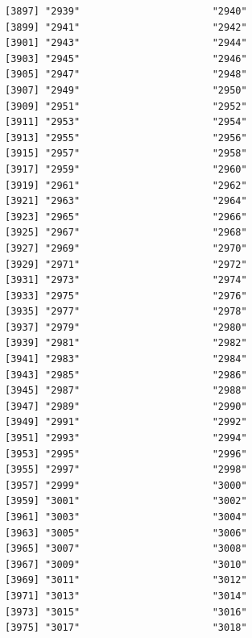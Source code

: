 \documentclass[
  letterpaper,
  DIV=11,
  numbers=noendperiod]{scrreprt}
\begin{document}
\begin{verbatim}
[3897] "2939"                       "2940"                      
[3899] "2941"                       "2942"                      
[3901] "2943"                       "2944"                      
[3903] "2945"                       "2946"                      
[3905] "2947"                       "2948"                      
[3907] "2949"                       "2950"                      
[3909] "2951"                       "2952"                      
[3911] "2953"                       "2954"                      
[3913] "2955"                       "2956"                      
[3915] "2957"                       "2958"                      
[3917] "2959"                       "2960"                      
[3919] "2961"                       "2962"                      
[3921] "2963"                       "2964"                      
[3923] "2965"                       "2966"                      
[3925] "2967"                       "2968"                      
[3927] "2969"                       "2970"                      
[3929] "2971"                       "2972"                      
[3931] "2973"                       "2974"                      
[3933] "2975"                       "2976"                      
[3935] "2977"                       "2978"                      
[3937] "2979"                       "2980"                      
[3939] "2981"                       "2982"                      
[3941] "2983"                       "2984"                      
[3943] "2985"                       "2986"                      
[3945] "2987"                       "2988"                      
[3947] "2989"                       "2990"                      
[3949] "2991"                       "2992"                      
[3951] "2993"                       "2994"                      
[3953] "2995"                       "2996"                      
[3955] "2997"                       "2998"                      
[3957] "2999"                       "3000"                      
[3959] "3001"                       "3002"                      
[3961] "3003"                       "3004"                      
[3963] "3005"                       "3006"                      
[3965] "3007"                       "3008"                      
[3967] "3009"                       "3010"                      
[3969] "3011"                       "3012"                      
[3971] "3013"                       "3014"                      
[3973] "3015"                       "3016"                      
[3975] "3017"                       "3018"                      

\end{verbatim}
\end{document}
